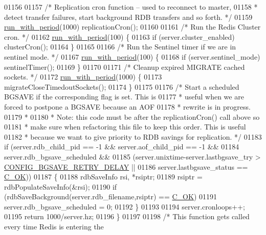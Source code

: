 \begin{DoxyCode}
{{{{{{{{{{{{01156 
01157     \textcolor{comment}{/* Replication cron function -- used to reconnect to master,}
01158 \textcolor{comment}{     * detect transfer failures, start background RDB transfers and so forth. */}
01159     \hyperlink{server_8h_aeb204872adbaabc0bd56c64f562b7928}{run\_with\_period}(1000) replicationCron();
01160 
01161     \textcolor{comment}{/* Run the Redis Cluster cron. */}
01162     \hyperlink{server_8h_aeb204872adbaabc0bd56c64f562b7928}{run\_with\_period}(100) \{
01163         \textcolor{keywordflow}{if} (server.cluster\_enabled) clusterCron();
01164     \}
01165 
01166     \textcolor{comment}{/* Run the Sentinel timer if we are in sentinel mode. */}
01167     \hyperlink{server_8h_aeb204872adbaabc0bd56c64f562b7928}{run\_with\_period}(100) \{
01168         \textcolor{keywordflow}{if} (server.sentinel\_mode) sentinelTimer();
01169     \}
01170 
01171     \textcolor{comment}{/* Cleanup expired MIGRATE cached sockets. */}
01172     \hyperlink{server_8h_aeb204872adbaabc0bd56c64f562b7928}{run\_with\_period}(1000) \{
01173         migrateCloseTimedoutSockets();
01174     \}
01175 
01176     \textcolor{comment}{/* Start a scheduled BGSAVE if the corresponding flag is set. This is}
01177 \textcolor{comment}{     * useful when we are forced to postpone a BGSAVE because an AOF}
01178 \textcolor{comment}{     * rewrite is in progress.}
01179 \textcolor{comment}{     *}
01180 \textcolor{comment}{     * Note: this code must be after the replicationCron() call above so}
01181 \textcolor{comment}{     * make sure when refactoring this file to keep this order. This is useful}
01182 \textcolor{comment}{     * because we want to give priority to RDB savings for replication. */}
01183     \textcolor{keywordflow}{if} (server.rdb\_child\_pid == -1 && server.aof\_child\_pid == -1 &&
01184         server.rdb\_bgsave\_scheduled &&
01185         (server.unixtime-server.lastbgsave\_try > \hyperlink{server_8h_a27e00ebd25c04beef22fabf61ea0b5ea}{CONFIG\_BGSAVE\_RETRY\_DELAY} ||
01186          server.lastbgsave\_status == \hyperlink{server_8h_a303769ef1065076e68731584e758d3e1}{C\_OK}))
01187     \{
01188         rdbSaveInfo rsi, *rsiptr;
01189         rsiptr = rdbPopulateSaveInfo(&rsi);
01190         \textcolor{keywordflow}{if} (rdbSaveBackground(server.rdb\_filename,rsiptr) == \hyperlink{server_8h_a303769ef1065076e68731584e758d3e1}{C\_OK})
01191             server.rdb\_bgsave\_scheduled = 0;
01192     \}
01193 
01194     server.cronloops++;
01195     \textcolor{keywordflow}{return} 1000/server.hz;
01196 \}
01197 
01198 \textcolor{comment}{/* This function gets called every time Redis is entering the}
}}}}}}}}}}}}
\end{DoxyCode}
